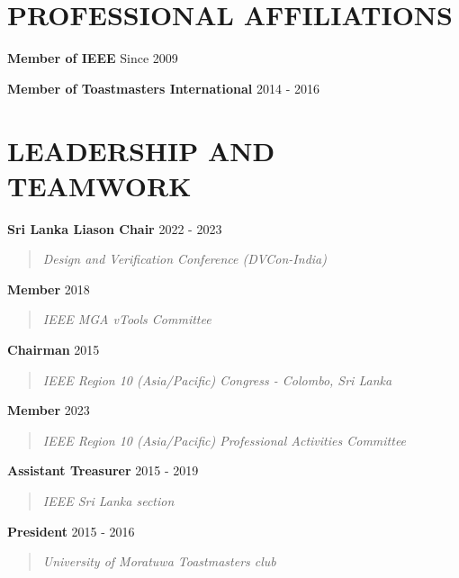\documentclass[mm]{res} %
\begin{document}
\begin{resume}
\section{PROFESSIONAL AFFILIATIONS} 

\textbf{Member of IEEE} \hfill Since 2009 


\textbf{Member of Toastmasters International} \hfill 2014 - 2016

\vspace{2 mm}
\section{LEADERSHIP AND TEAMWORK} 

\textbf{Sri Lanka Liason Chair} \hfill 2022 - 2023 
\begin{quote}
	\emph{Design and Verification Conference (DVCon-India)}
\end{quote}

\textbf{Member} \hfill 2018 
\begin{quote}
\emph{IEEE MGA vTools Committee}
\end{quote}

\textbf{Chairman} \hfill 2015 
\begin{quote}
\emph{IEEE Region 10 (Asia/Pacific) Congress - Colombo, Sri Lanka}
\end{quote}

\textbf{Member} \hfill 2023 
\begin{quote}
	\emph{IEEE Region 10 (Asia/Pacific) Professional Activities Committee}
\end{quote}

\textbf{Assistant Treasurer} \hfill 2015 - 2019
\begin{quote}
\emph{IEEE Sri Lanka section}
\end{quote}


\textbf{President} \hfill 2015 - 2016 
\begin{quote}
\emph{University of Moratuwa Toastmasters club}
\end{quote}


\end{resume}
\end{document}

